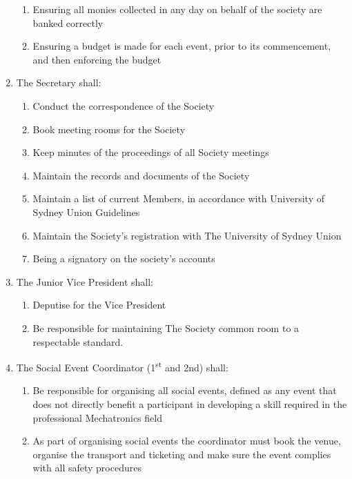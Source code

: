 \documentclass[11pt]{article}
\begin{document}
\begin{enumerate}[\thesection .1]
\begin{enumerate}[\hspace{5mm}5.4.1]
        \item Ensuring all monies collected in any day on behalf of the society are banked correctly
        \item Ensuring a budget is made for each event, prior to its commencement, and then enforcing the budget
    \end{enumerate}
    \item The Secretary shall:
    \begin{enumerate}[\hspace{5mm}5.5.1]
        \item Conduct the correspondence of the Society
        \item Book meeting rooms for the Society
        \item Keep minutes of the proceedings of all Society meetings
        \item Maintain the records and documents of the Society
        \item Maintain a list of current Members, in accordance with University of Sydney Union Guidelines
        \item Maintain the Society’s registration with The University of Sydney Union
        \item Being a signatory on the society’s accounts
    \end{enumerate}
    \item The Junior Vice President shall:
    \begin{enumerate}[\hspace{5mm}5.3.1]
        \item Deputise for the Vice President
        \item Be responsible for maintaining The Society common room to a respectable standard.
    \end{enumerate}
    \item The Social Event Coordinator (1\textsuperscript{st} and 2nd) shall:
    \begin{enumerate}
        \item Be responsible for organising all social events, defined as any event that does not directly benefit a participant in developing a skill required in the professional Mechatronics field
        \item As part of organising social events the coordinator must book the venue, organise the transport and ticketing and make sure the event complies with all safety procedures

\end{enumerate}
\end{enumerate}
\end{document}
